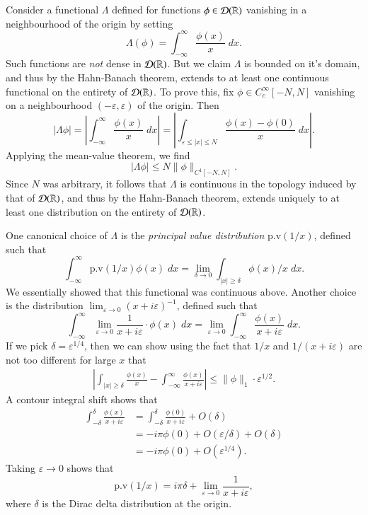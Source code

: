 \begin{example}
    Consider a functional $\Lambda$ defined for functions $\phi \in \operatorname{\mathcal{D}}(\operatorname{\mathbb{R}})$ vanishing in a neighbourhood of the origin by setting
    \[ \Lambda(\phi) = \int_{-\infty}^\infty \frac{\phi(x)}{x}\; dx. \]
    Such functions are \emph{not} dense in $\operatorname{\mathcal{D}}(\operatorname{\mathbb{R}})$. But we claim $\Lambda$ is bounded on it's domain, and thus by the Hahn-Banach theorem, extends to at least one continuous functional on the entirety of $\operatorname{\mathcal{D}}(\operatorname{\mathbb{R}})$. To prove this, fix $\phi \in C_c^\infty[-N,N]$ vanishing on a neighbourhood $(-\varepsilon,\varepsilon)$ of the origin. Then
    \[ |\Lambda \phi| = \left| \int_{-\infty}^\infty \frac{\phi(x)}{x}\; dx \right| = \left| \int_{\varepsilon \leq |x| \leq N} \frac{\phi(x) - \phi(0)}{x}\; dx \right|. \]
    Applying the mean-value theorem, we find
    \[ |\Lambda \phi| \leq N \| \phi \|_{C^1[-N,N]}. \]
    Since $N$ was arbitrary, it follows that $\Lambda$ is continuous in the topology induced by that of $\operatorname{\mathcal{D}}(\operatorname{\mathbb{R}})$, and thus by the Hahn-Banach theorem, extends uniquely to at least one distribution on the entirety of $\operatorname{\mathcal{D}}(\operatorname{\mathbb{R}})$.

    One canonical choice of $\Lambda$ is the \emph{principal value distribution} $\text{p.v}(1/x)$, defined such that
    \[ \int_{-\infty}^\infty \text{p.v}(1/x) \phi(x)\; dx = \lim_{\delta \to 0} \int_{|x| \geq \delta} \phi(x) / x\; dx. \]
    We essentially showed that this functional was continuous above. Another choice is the distribution $\lim_{\varepsilon \to 0} (x + i \varepsilon)^{-1}$, defined such that
    \[ \int_{-\infty}^\infty \lim_{\varepsilon \to 0} \frac{1}{x + i \varepsilon} \cdot \phi(x)\; dx = \lim_{\varepsilon \to 0} \int_{-\infty}^\infty \frac{\phi(x)}{x + i \varepsilon}\; dx. \]
    If we pick $\delta = \varepsilon^{1/4}$, then we can show using the fact that $1/x$ and $1/(x + i \varepsilon)$ are not too different for large $x$ that
    \begin{align*}
        \left| \int_{|x| \geq \delta} \frac{\phi(x)}{x} - \int_{-\infty}^\infty \frac{\phi(x)}{x + i\varepsilon} \right| \leq \| \phi \|_1 \cdot \varepsilon^{1/2}.
    \end{align*}
    A contour integral shift shows that
    \begin{align*}
        \int_{-\delta}^\delta \frac{\phi(x)}{x + i\varepsilon} &= \int_{-\delta}^\delta \frac{\phi(0)}{x + i \varepsilon} + O(\delta)\\
        &= -i \pi \phi(0) + O(\varepsilon / \delta) + O(\delta)\\
        &= -i \pi \phi(0) + O(\varepsilon^{1/4}).
    \end{align*}
    Taking $\varepsilon \to 0$ shows that
    \[ \text{p.v}(1/x) = i \pi \delta + \lim_{\varepsilon \to 0} \frac{1}{x + i \varepsilon}, \]
    where $\delta$ is the Dirac delta distribution at the origin.


\end{example}
